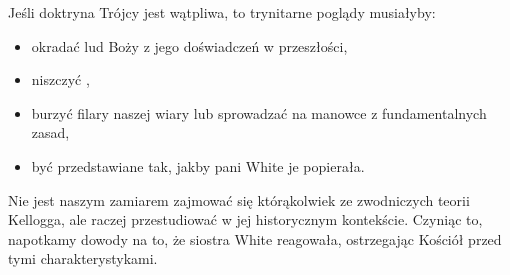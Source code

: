 Jeśli doktryna Trójcy jest wątpliwa, to trynitarne poglądy musiałyby:
\begin{itemize}
    \item okradać lud Boży z jego doświadczeń w przeszłości,
    \item niszczyć ,
    \item burzyć filary naszej wiary lub sprowadzać na manowce z fundamentalnych zasad,
    \item być przedstawiane tak, jakby pani White je popierała.
\end{itemize}

Nie jest naszym zamiarem zajmować się którąkolwiek ze zwodniczych teorii Kellogga, ale raczej przestudiować  w jej historycznym kontekście. Czyniąc to, napotkamy dowody na to, że siostra White reagowała, ostrzegając Kościół przed tymi charakterystykami.


